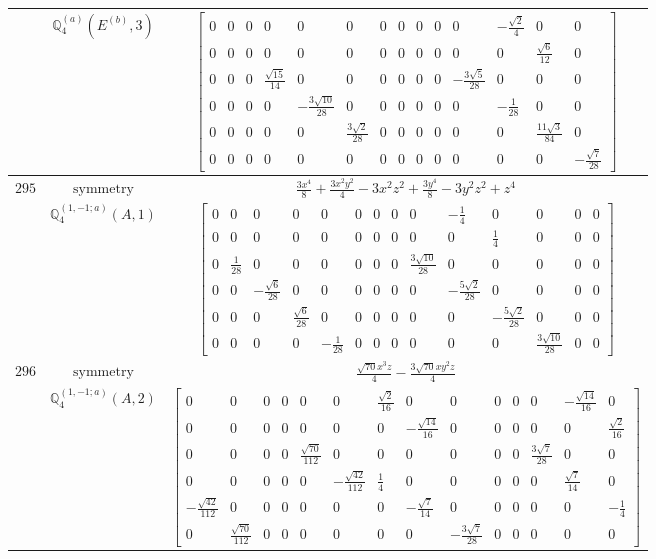 \documentclass[fleqn,8pt,landscape]{jsarticle}
\begin{document}
\begin{longtable}{ccc}
$  $ & $ \mathbb{Q}_{4}^{(a)}(E^{(b)},3) $ & $ \begin{bmatrix} 0 & 0 & 0 & 0 & 0 & 0 & 0 & 0 & 0 & 0 & 0 & - \frac{\sqrt{2}}{4} & 0 & 0 \\ 0 & 0 & 0 & 0 & 0 & 0 & 0 & 0 & 0 & 0 & 0 & 0 & \frac{\sqrt{6}}{12} & 0 \\ 0 & 0 & 0 & \frac{\sqrt{15}}{14} & 0 & 0 & 0 & 0 & 0 & 0 & - \frac{3 \sqrt{5}}{28} & 0 & 0 & 0 \\ 0 & 0 & 0 & 0 & - \frac{3 \sqrt{10}}{28} & 0 & 0 & 0 & 0 & 0 & 0 & - \frac{1}{28} & 0 & 0 \\ 0 & 0 & 0 & 0 & 0 & \frac{3 \sqrt{2}}{28} & 0 & 0 & 0 & 0 & 0 & 0 & \frac{11 \sqrt{3}}{84} & 0 \\ 0 & 0 & 0 & 0 & 0 & 0 & 0 & 0 & 0 & 0 & 0 & 0 & 0 & - \frac{\sqrt{7}}{28} \end{bmatrix} $ \\ \hline
$ 295 $ & $ \text{symmetry} $ & $ \frac{3 x^{4}}{8} + \frac{3 x^{2} y^{2}}{4} - 3 x^{2} z^{2} + \frac{3 y^{4}}{8} - 3 y^{2} z^{2} + z^{4} $ \\
$  $ & $ \mathbb{Q}_{4}^{(1,-1;a)}(A,1) $ & $ \begin{bmatrix} 0 & 0 & 0 & 0 & 0 & 0 & 0 & 0 & 0 & - \frac{1}{4} & 0 & 0 & 0 & 0 \\ 0 & 0 & 0 & 0 & 0 & 0 & 0 & 0 & 0 & 0 & \frac{1}{4} & 0 & 0 & 0 \\ 0 & \frac{1}{28} & 0 & 0 & 0 & 0 & 0 & 0 & \frac{3 \sqrt{10}}{28} & 0 & 0 & 0 & 0 & 0 \\ 0 & 0 & - \frac{\sqrt{6}}{28} & 0 & 0 & 0 & 0 & 0 & 0 & - \frac{5 \sqrt{2}}{28} & 0 & 0 & 0 & 0 \\ 0 & 0 & 0 & \frac{\sqrt{6}}{28} & 0 & 0 & 0 & 0 & 0 & 0 & - \frac{5 \sqrt{2}}{28} & 0 & 0 & 0 \\ 0 & 0 & 0 & 0 & - \frac{1}{28} & 0 & 0 & 0 & 0 & 0 & 0 & \frac{3 \sqrt{10}}{28} & 0 & 0 \end{bmatrix} $ \\ \hline
$ 296 $ & $ \text{symmetry} $ & $ \frac{\sqrt{70} x^{3} z}{4} - \frac{3 \sqrt{70} x y^{2} z}{4} $ \\
$  $ & $ \mathbb{Q}_{4}^{(1,-1;a)}(A,2) $ & $ \begin{bmatrix} 0 & 0 & 0 & 0 & 0 & 0 & \frac{\sqrt{2}}{16} & 0 & 0 & 0 & 0 & 0 & - \frac{\sqrt{14}}{16} & 0 \\ 0 & 0 & 0 & 0 & 0 & 0 & 0 & - \frac{\sqrt{14}}{16} & 0 & 0 & 0 & 0 & 0 & \frac{\sqrt{2}}{16} \\ 0 & 0 & 0 & 0 & \frac{\sqrt{70}}{112} & 0 & 0 & 0 & 0 & 0 & 0 & \frac{3 \sqrt{7}}{28} & 0 & 0 \\ 0 & 0 & 0 & 0 & 0 & - \frac{\sqrt{42}}{112} & \frac{1}{4} & 0 & 0 & 0 & 0 & 0 & \frac{\sqrt{7}}{14} & 0 \\ - \frac{\sqrt{42}}{112} & 0 & 0 & 0 & 0 & 0 & 0 & - \frac{\sqrt{7}}{14} & 0 & 0 & 0 & 0 & 0 & - \frac{1}{4} \\ 0 & \frac{\sqrt{70}}{112} & 0 & 0 & 0 & 0 & 0 & 0 & - \frac{3 \sqrt{7}}{28} & 0 & 0 & 0 & 0 & 0 \end{bmatrix} $ \\ \hline

\end{longtable}
\end{document}
